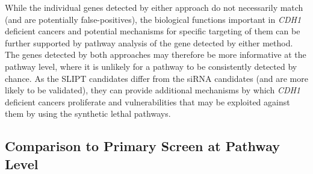 While the individual genes detected by either approach do not necessarily match (and are potentially false-positives), the biological functions important in \textit{CDH1} deficient cancers and potential mechanisms for specific targeting of them can be further supported by pathway analysis of the gene detected by either method. The genes detected by both approaches may therefore be more informative at the pathway level, where it is unlikely for a pathway to be consistently detected by chance. As the \gls{SLIPT} candidates differ from the \gls{siRNA} candidates (and are more likely to be validated), they can provide additional mechanisms by which \textit{CDH1} deficient cancers proliferate and vulnerabilities that may be exploited against them by using the \gls{synthetic lethal} pathways.

\FloatBarrier

\subsection{Comparison to Primary Screen at Pathway Level}  \label{chapt3:compare_pathway}

